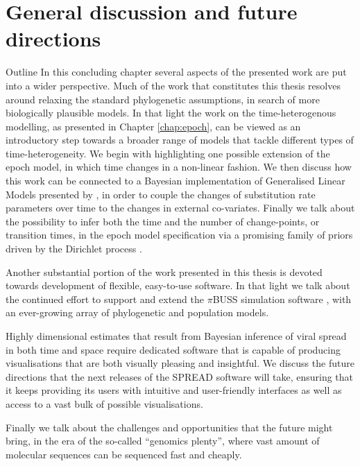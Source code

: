 \chapter{General discussion and future directions}

\begin{remark}{Outline}
In this concluding chapter several aspects of the presented work are put into a wider perspective.
Much of the work that constitutes this thesis resolves around relaxing the standard phylogenetic assumptions, in search of more biologically plausible models. 
In that light the work on the time-heterogenous modelling, as presented in Chapter \ref{chap:epoch}, can be viewed as an introductory step towards a broader range of models that tackle different types of time-heterogeneity.
We begin with highlighting one possible extension of the epoch model, in which time changes in a non-linear fashion.
We then discuss how this work can be connected to a Bayesian implementation of Generalised Linear Models presented by \citet{Lemey2014}, in order to couple the changes of substitution rate parameters over time to the changes in external co-variates.
Finally we talk about the possibility to infer both the time and the number of change-points, or transition times, in the epoch model specification via a promising family of priors driven by the Dirichlet process \citep{Ferguson1973}. 

Another substantial portion of the work presented in this thesis is devoted towards development of flexible, easy-to-use software.
In that light we talk about the continued effort to support and extend the $\pi$BUSS simulation software \citep{Bielejec2014b}, with an ever-growing array of phylogenetic and population models.

Highly dimensional estimates that result from Bayesian inference of viral spread in both time and space require dedicated software that is capable of producing visualisations that are both visually pleasing and insightful.
We discuss the future directions that the next releases of the SPREAD software \citep{Bielejec2011} will take, ensuring that it keeps providing its users with intuitive and user-friendly interfaces as well as access to a vast bulk of possible visualisations.

Finally we talk about the challenges and opportunities that the future might bring, in the era of the so-called ``genomics plenty'', where vast amount of molecular sequences can be sequenced fast and cheaply.
\end{remark}

